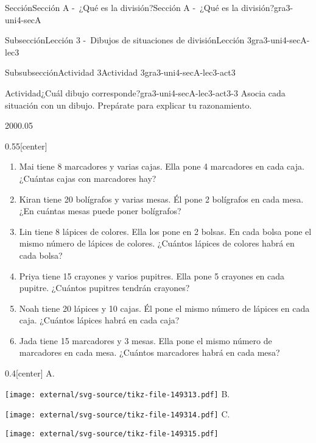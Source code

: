 \documentclass[twoside,14pt,]{extarticle}
\begin{document}
\begin{sectionptx}{Sección}{Sección A -~¿Qué es la división?}{}{Sección A -~¿Qué es la división?}{}{}{gra3-uni4-secA}
\begin{subsectionptx}{Subsección}{Lección 3 -~Dibujos de situaciones de división}{}{Lección 3}{}{}{gra3-uni4-secA-lec3}
\typeout{************************************************}
%
\begin{subsubsectionptx}{Subsubsección}{Actividad 3}{}{Actividad 3}{}{}{gra3-uni4-secA-lec3-act3}
\begin{activity}{Actividad}{¿Cuál dibujo corresponde?}{gra3-uni4-secA-lec3-act3-3}%
Asocia cada situación con un dibujo. Prepárate para explicar tu razonamiento.%
\begin{sidebyside}{2}{0}{0}{0.05}%
\begin{sbspanel}{0.55}[center]%
%
\begin{enumerate}
\item{}Mai tiene 8 marcadores y varias cajas. Ella pone 4 marcadores en cada caja. ¿Cuántas cajas con marcadores hay?%
\item{}Kiran tiene 20 bolígrafos y varias mesas. Él pone 2 bolígrafos en cada mesa. ¿En cuántas mesas puede poner bolígrafos?%
\item{}Lin tiene 8 lápices de colores. Ella los pone en 2 bolsas. En cada bolsa pone el mismo número de lápices de colores. ¿Cuántos lápices de colores habrá en cada bolsa?%
\item{}Priya tiene 15 crayones y varios pupitres. Ella pone 5 crayones en cada pupitre. ¿Cuántos pupitres tendrán crayones?%
\item{}Noah tiene 20 lápices y 10 cajas. Él pone el mismo número de lápices en cada caja. ¿Cuántos lápices habrá en cada caja?%
\item{}Jada tiene 15 marcadores y 3 mesas. Ella pone el mismo número de marcadores en cada mesa. ¿Cuántos marcadores habrá en cada mesa?%
\end{enumerate}
\end{sbspanel}%
\begin{sbspanel}{0.4}[center]%
A.%
\par
\texttt{[image: external/svg-source/tikz-file-149313.pdf]}
B.%
\par
\texttt{[image: external/svg-source/tikz-file-149314.pdf]}
C.%
\par
\texttt{[image: external/svg-source/tikz-file-149315.pdf]}
\end{sbspanel}%
\end{sidebyside}%
\end{activity}%
\end{subsubsectionptx}
%
%
\typeout{************************************************}

\end{subsectionptx}
\end{sectionptx}
\end{document}
